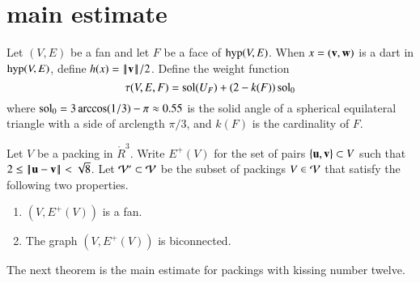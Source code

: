 \documentclass{llncs}
\def\op#1{{\hbox{#1}}}
\begin{document}
\section{main estimate}

Let $(V,E)$ be a fan and let $F$ be a face of $\op{hyp}(V,E)$.
When $x=({\mathbf v},{\mathbf w})$ is a dart in $\op{hyp}(V,E)$, define $h(x) = {\hbox{\ensuremath{\hspace{0.1em}|\hspace{-0.1em}|\hspace{0.1em}}}{\mathbf v}\hbox{\ensuremath{\hspace{0.1em}|\hspace{-0.1em}|\hspace{0.1em}}}}/2$.
Define the weight function
\begin{equation}
  \tau(V,E,F) 
  = \operatorname{sol}(U_F) + (2- k(F))\operatorname{sol}_0
\label{eqn:tau-sol}
\end{equation}
where $\operatorname{sol}_0=3\arccos(1/3)-\pi\approx 0.55$ is the solid angle of a
spherical equilateral triangle with a side of arclength $\pi/3$, and
$k(F)$ is the cardinality of $F$.
% 



\begin{definition}[$\CalV'$,~$E^+(V)$]
Let $V$ be a packing in $\ring{R}^3$.
  Write
$E^+(V)$ for the set of pairs $\{{\mathbf u},{\mathbf v}\}\subset V$
  such that $2\le\norm{\u}{\v} <\sqrt8$.
Let ${\mathcal V}'\subset{\mathcal V}$ be the subset of packings $V\in{\mathcal V}$ that
satisfy the following two properties. 
\begin{enumerate}
\item  $(V,E^+(V))$ is a fan.
\item The graph $(V,E^+(V))$ is biconnected.
\end{enumerate}
\end{definition}
%
%




The next theorem is the main estimate for packings with kissing number twelve.
%
\end{document}

